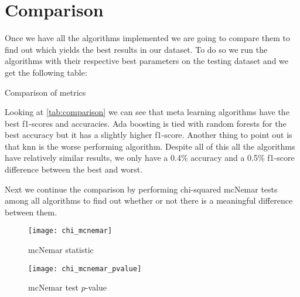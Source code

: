 
\section{Comparison}%
\label{sec:comparison}


Once we have all the algorithms implemented we are going to compare them to find out which yields the best results in our dataset. To do so we run the algorithms with their respective best parameters on the testing dataset and we get the following table:

\begin{table}[H]
\centering
\caption{Comparison of metrics}%
\label{tab:comparison}

\end{table}

Looking at \cref{tab:comparison} we can see that meta learning algorithms have the best f1-scores and accuracies. Ada boosting is tied with random forests for the best accuracy but it has a slightly higher f1-score. Another thing to point out is that knn is the worse performing algorithm. Despite all of this all the algorithms have relatively similar results, we only have a 0.4\% accuracy and a 0.5\% f1-score difference between the best and worst. 

Next we continue the comparison by performing chi-squared mcNemar tests among all algorithms to find out whether or not there is a meaningful difference between them.

\begin{figure}[H]
\centering
\texttt{[image: chi\_mcnemar]}
\caption{mcNemar statistic}
\end{figure}

\begin{figure}[H]
\centering
\texttt{[image: chi\_mcnemar\_pvalue]}
\caption{mcNemar test $p$-value}
\end{figure}

